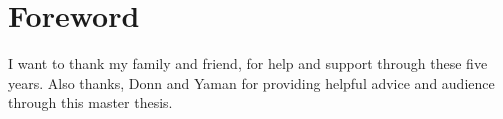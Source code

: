 \chapter{Foreword}

I want to thank my family and friend, for help and support through these five years. Also thanks, Donn and Yaman for providing helpful advice and audience through this master thesis. 
